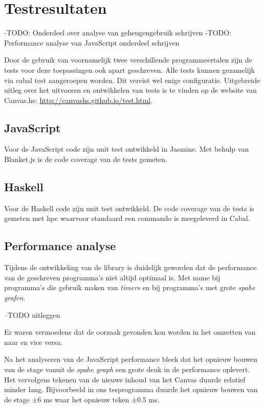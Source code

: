 \section{Testresultaten} \label{sec:testresultaten}

-TODO: Onderdeel over analyse van geheugengebruik schrijven
-TODO: Performance analyse van JavaScript onderdeel schrijven

Door de gebruik van voornamelijk twee verschillende programmeertalen zijn de tests voor deze toepassingen ook apart geschreven. Alle tests kunnen gezamelijk via cabal test aangeroepen worden. Dit vereist wel enige configuratie. Uitgebreide uitleg over het uitvoeren en ontwikkelen van tests is te vinden op de website van Canvas.hs: \url{http://canvashs.github.io/test.html}.

\subsection{JavaScript}
Voor de JavaScript code zijn unit test ontwikkeld in Jasmine. Met behulp van Blanket.js is de code coverage van de tests gemeten.

\subsection{Haskell}
Voor de Haskell code zijn unit test ontwikkeld. De code coverage van de tests is gemeten met hpc waarvoor standaard een commando is meegeleverd in Cabal.

\subsection{Performance analyse}
Tijdens de ontwikkeling van de library is duidelijk geworden dat de performance van de geschreven programma's niet altijd optimaal is. Met name bij programma's die gebruik maken van \emph{timers} en bij programma's met grote \emph{spahe grafen}.

--TODO uitleggen

Er waren vermoedens dat de oorzaak gevonden kon worden in het omzetten van  naar  en vice versa.

Na het analyseren van de JavaScript performance bleek dat het opnieuw bouwen van de stage vanuit de \emph{spahe graph} een grote deuk in de performance oplevert. Het vervolgens tekenen van de nieuwe inhoud van het Canvas duurde relatief minder lang. Bijvoorbeeld in ons tesprogramma duurde het opnieuw bouwen van de stage ±6 ms waar het opnieuw teken ±0.5 ms.

